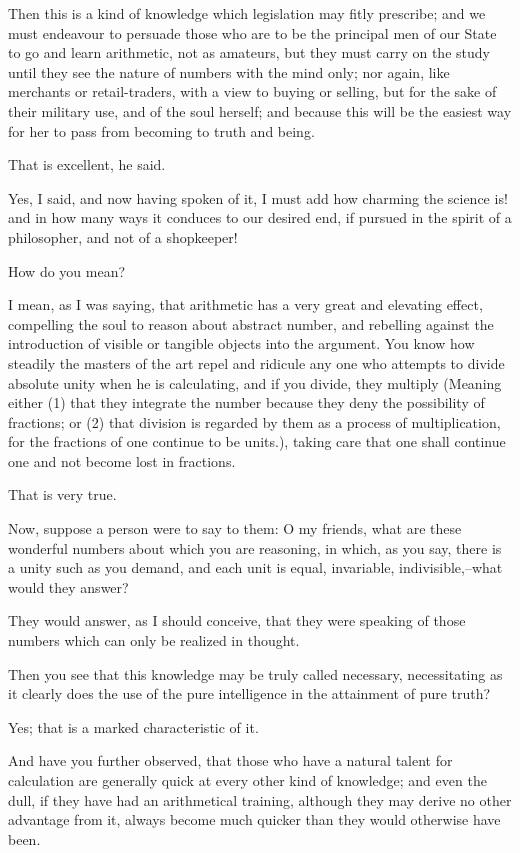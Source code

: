 Then this is a kind of knowledge which legislation may fitly prescribe;
and we must endeavour to persuade those who are to be the principal men
of our State to go and learn arithmetic, not as amateurs, but they must
carry on the study until they see the nature of numbers with the mind
only; nor again, like merchants or retail-traders, with a view to buying
or selling, but for the sake of their military use, and of the soul
herself; and because this will be the easiest way for her to pass from
becoming to truth and being.

That is excellent, he said.

Yes, I said, and now having spoken of it, I must add how charming the
science is! and in how many ways it conduces to our desired end, if
pursued in the spirit of a philosopher, and not of a shopkeeper!

How do you mean?

I mean, as I was saying, that arithmetic has a very great and elevating
effect, compelling the soul to reason about abstract number, and
rebelling against the introduction of visible or tangible objects into
the argument. You know how steadily the masters of the art repel and
ridicule any one who attempts to divide absolute unity when he is
calculating, and if you divide, they multiply (Meaning either (1)
that they integrate the number because they deny the possibility of
fractions; or (2) that division is regarded by them as a process of
multiplication, for the fractions of one continue to be units.), taking
care that one shall continue one and not become lost in fractions.

That is very true.

Now, suppose a person were to say to them: O my friends, what are these
wonderful numbers about which you are reasoning, in which, as you say,
there is a unity such as you demand, and each unit is equal, invariable,
indivisible,--what would they answer?

They would answer, as I should conceive, that they were speaking of
those numbers which can only be realized in thought.

Then you see that this knowledge may be truly called necessary,
necessitating as it clearly does the use of the pure intelligence in the
attainment of pure truth?

Yes; that is a marked characteristic of it.

And have you further observed, that those who have a natural talent for
calculation are generally quick at every other kind of knowledge; and
even the dull, if they have had an arithmetical training, although they
may derive no other advantage from it, always become much quicker than
they would otherwise have been.

